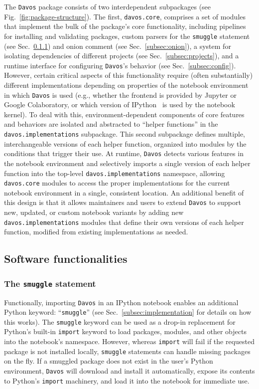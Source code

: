 \documentclass[preprint,12pt,a4paper]{elsarticle}
\begin{document}
The \texttt{Davos} package consists of two interdependent subpackages
(see Fig.~\ref{fig:package-structure}). The first,
\texttt{davos.core}, comprises a set of modules that
implement the bulk of the package's core
functionality, including pipelines for installing and validating
packages, custom parsers for the \texttt{smuggle} statement (see
Sec.~\ref{subsec:smuggle}) and onion comment (see
Sec.~\ref{subsec:onion}), a system for isolating dependencies of
different projects (see Sec.~\ref{subsec:projects}), and a runtime
interface for configuring \texttt{Davos}'s behavior (see Sec.~\ref{subsec:config}).
However, certain critical aspects of this
functionality require (often substantially) different implementations
depending on properties of the notebook environment in which
\texttt{Davos} is used (e.g., whether the frontend is provided by
Jupyter or Google Colaboratory, or which version of
IPython~\cite{PereGran07} is used by the notebook kernel). To deal
with this, environment-dependent components of core features and behaviors
are isolated and abstracted to ``helper functions'' in the
\texttt{davos.implementations} subpackage. This second subpackage
defines multiple, interchangeable versions of each helper function,
organized into modules by the conditions that trigger their use. At
runtime, \texttt{Davos} detects various features in the notebook
environment and selectively imports a single version of each helper
function into the top-level \texttt{davos.implementations} namespace,
allowing \texttt{davos.core} modules to access the proper
implementations for the current notebook environment in a single,
consistent location. An additional benefit of this design is that it
allows maintainers and users to extend \texttt{Davos} to
support new, updated, or custom notebook variants by adding new
\texttt{davos.implementations} modules that define their own versions
of each helper function, modified from existing implementations as
needed.


\subsection{Software functionalities}

\subsubsection{The \texttt{smuggle} statement}\label{subsec:smuggle}

Functionally, importing \texttt{Davos} in an IPython notebook enables
an additional Python keyword: ``\texttt{smuggle}'' (see
Sec.~\ref{subsec:implementation} for details on how this works).
The \texttt{smuggle} keyword can be used as a drop-in
replacement for Python's built-in \texttt{import} keyword to load
packages, modules, and other objects into the notebook's namespace.
However, whereas \texttt{import} will fail if the requested package is
not installed locally, \texttt{smuggle} statements can handle missing
packages on the fly. If a smuggled package does not exist in the
user's Python environment, \texttt{Davos} will download and install it automatically,
expose its contents to Python's \texttt{import} machinery, and load it
into the notebook for immediate use.
\end{document}
